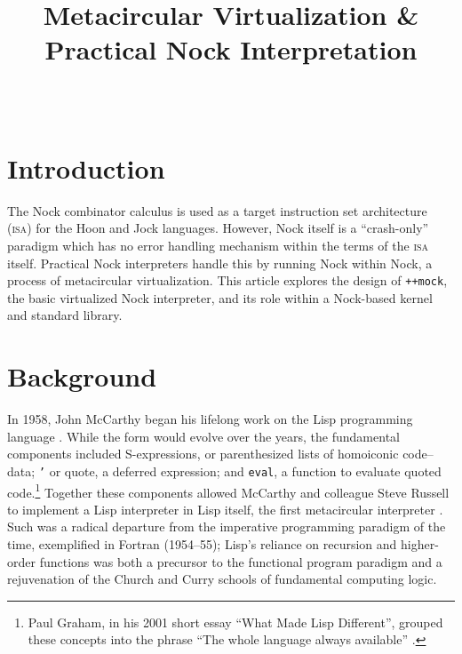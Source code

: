 \documentclass[twoside]{article}
\title{Metacircular Virtualization \& Practical Nock Interpretation}
\author{\authorname~\authorpatp \\ \affiliation}
\date{}
\begin{document}
\maketitle
\thispagestyle{firststyle}

\begin{abstract}
\end{abstract}

\setcounter{page}{1}

\tableofcontents

\section{Introduction}

The Nock combinator calculus is used as a target instruction set architecture (\textsc{isa}) for the Hoon and Jock languages.  However, Nock itself is a ``crash-only'' paradigm which has no error handling mechanism within the terms of the \textsc{isa} itself.  Practical Nock interpreters handle this by running Nock within Nock, a process of metacircular virtualization.  This article explores the design of \lstinline[style=inlinecode]{++mock}, the basic virtualized Nock interpreter, and its role within a Nock-based kernel and standard library.

\section{Background}

In 1958, John McCarthy began his lifelong work on the Lisp programming language \citep{McCarthy1996}.  While the form would evolve over the years, the fundamental components included S-expressions, or parenthesized lists of homoiconic code–data; \texttt{'} or quote, a deferred expression; and \texttt{eval}, a function to evaluate quoted code.\footnote{Paul Graham, in his 2001 short essay ``What Made Lisp Different'', grouped these concepts into the phrase ``The whole language always available'' \citep{Graham2001}.}  Together these components allowed McCarthy and colleague Steve Russell to implement a Lisp interpreter in Lisp itself, the first metacircular interpreter \citep{McCarthy1978}.  Such was a radical departure from the imperative programming paradigm of the time, exemplified in Fortran (1954–55); Lisp's reliance on recursion and higher-order functions was both a precursor to the functional program paradigm and a rejuvenation of the Church and Curry schools of fundamental computing logic.
\end{document}

